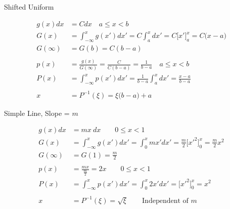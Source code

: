 \documentclass[xcolor=x11names,compress,handout]{beamer}
\renewcommand{\(}{\begin{columns}}
\renewcommand{\)}{\end{columns}}
\newcommand{\<}[1]{\begin{column}{#1}}
\renewcommand{\>}{\end{column}}
\begin{document}
\begin{frame}{Shifted Uniform}

\[
  \begin{aligned}
g(x) dx &= C dx \quad a \leq x < b\\
G(x) &= \int_{-\infty}^x g(x')dx' = C \int_a^x dx' = C\bigl[x' \bigr]_a^x = C \bigl(x - a)\\
    G(\infty) &= G(b) = C(b-a)\\
\\p(x) &= \frac{g(x)}{G(\infty)} = \frac{C}{C(b-a)} = \frac{1}{b-a} \quad a \leq x < b\\
P(x) &= \int_{-\infty}^x p(x')dx' = \frac{1}{b-a}\int_a^x dx' = \frac{x-a}{b-a}\\
    &\\
    x &= P^{-1}(\xi) = \xi\bigl(b-a\bigr) + a
  \end{aligned}
\]    
    
\end{frame}


\begin{frame}{Simple Line, Slope = $m$}

\[
  \begin{aligned}
g(x) dx &= mx\:dx \qquad 0 \leq x < 1\\
G(x) &= \int_{-\infty}^x g(x')dx' = \int_0^x mx' dx' = \frac{m}{2}\bigl[x'^2 \bigr]_0^x = \frac{m}{2} x^2\\
    G(\infty) &= G(1) = \frac{m}{2}\\
\\p(x) &= \frac{mx}{\frac{m}{2}} = 2x \qquad 0 \leq x < 1\\
P(x) &= \int_{-\infty}^x p(x')dx' = \int_0^x 2x' dx' = \bigl[x'^2 \bigr]_0^x = x^2\\
    &\\
    x &= P^{-1}(\xi) = \sqrt{\xi} \qquad\text{Independent of }m
  \end{aligned}
\]    
    
\end{frame}
\end{document}
